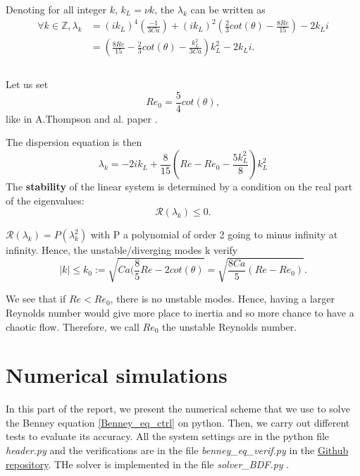 \documentclass[12pt]{article}
\begin{document}
Denoting for all integer $k$, $k_L = \nu k$, the $\lambda_k$ can be written as 
\begin{equation*}
\begin{aligned}
    \forall k\in \mathbb{Z}, \lambda_k &= (ik_L)^4(\frac{-1}{3Ca})+(ik_L)^2(\frac{2}{3}cot(\theta)-\frac{8Re}{15})-2k_Li \\
    &= (\frac{8Re}{15}-\frac{2}{3}cot(\theta) -\frac{k_L^2}{3Ca})k_L^2 - 2k_Li. \\ \\
\end{aligned}
\end{equation*}

Let us set \begin{equation}
    Re_0 = \frac{5}{4}cot(\theta), 
\end{equation}
like in A.Thompson and al. paper \cite{Thompson_2016_prop_ctrl}.

The dispersion equation is then 
\begin{equation}\label{dispersion_relation}
\boxed{
    \lambda_k = -2ik_L+ \frac{8}{15}\left( Re-Re_0-\frac{5k_L^2}{8}\right)k_L^2
}
\end{equation}
The \textbf{stability} of the linear system is determined by a condition on the real part of the eigenvalues: $$\mathcal{R}(\lambda_k)\leq0.$$

$\mathcal{R}(\lambda_k) = P(\lambda_k^2)$ with P a polynomial of order 2 going to minus infinity at infinity. Hence, the unstable/diverging modes k verify 
\begin{equation}\label{eq:k_0_critical_wave_number}
|k|\leq k_0 := \sqrt{Ca(\frac{8}{5}Re-2cot(\theta)} = \sqrt{\frac{8Ca}{5}(Re-Re_0)}.
\end{equation}

We see that if $Re<Re_0$, there is no unstable modes. Hence, having a larger Reynolds number would give more place to inertia and so more chance to have a chaotic flow. Therefore, we call $Re_0$ the unstable Reynolds number.

\newpage





\section{Numerical simulations}\label{Section_Numerical_simu}
In this part of the report, we present the numerical scheme that we use to solve the Benney equation 
\eqref{Benney_eq_ctrl} on python. Then, we carry out different tests to evaluate its accuracy. All the system
 settings are in the python file \textit{header.py} and the verifications are in the file \textit{benney\_eq\_verif.py}
 in the \href{https://github.com/Bilal59170/Repo_Warwick_internship}{Github repository}. THe solver is implemented
 in the file \textit{solver\_BDF.py} .
\end{document}
